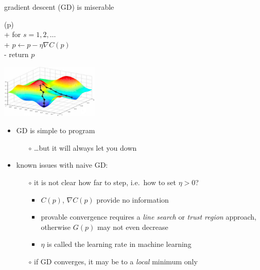 \documentclass[xcolor={svgnames},
               hyperref={colorlinks,citecolor=DeepPink4,linkcolor=FireBrick,urlcolor=Maroon}]
               {beamer}
\newcommand{\grad}{\nabla}
\begin{document}
\begin{frame}{gradient descent (GD) is miserable}

\begin{pseudo*}
(p)\text{:} \\+
    for $s = 1,2,\dots$ \\+
        $p \gets p - \eta \grad C(p)$ \\-
    return $p$
\end{pseudo*}

\vspace{-25mm}
\hfill \includegraphics[width=0.35\textwidth]{figs/gdsurface} \phantom{adslj}

\medskip
\begin{itemize}
\item GD is simple to program
    \begin{itemize}
    \item[$\circ$] \dots but it will always let you down
    \end{itemize}
\item known issues with naive GD:
    \begin{itemize}
    \item[$\circ$] it is not clear how far to step, i.e.~how to set $\eta>0$?
        \begin{itemize}
        \item $C(p)$, $\grad C(p)$ provide no information
        \item provable convergence requires a \emph{line search} or \emph{trust region} approach,  otherwise $G(p)$ may not even decrease
        \item $\eta$ is called the \alert{learning rate} in machine learning
        \end{itemize}
    \item[$\circ$] if GD converges, it may be to a \emph{local} minimum only
    \end{itemize}
\end{itemize}
\end{frame}
\end{document}
